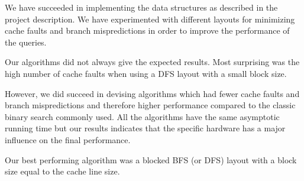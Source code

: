 We have succeeded in implementing the data structures as described in the project description. We have experimented with different layouts for minimizing cache faults and branch mispredictions in order to improve the performance of the queries.

Our algorithms did not always give the expected results. Most surprising was the high number of cache faults when using a DFS layout with a small block size.

However, we did succeed in devising algorithms which had fewer cache faults and branch mispredictions and therefore higher performance compared to the classic binary search commonly used. All the algorithms have the same asymptotic running time but our results indicates that the specific hardware has a major influence on the final performance.

Our best performing algorithm was a blocked BFS (or DFS) layout with a block size equal to the cache line size.